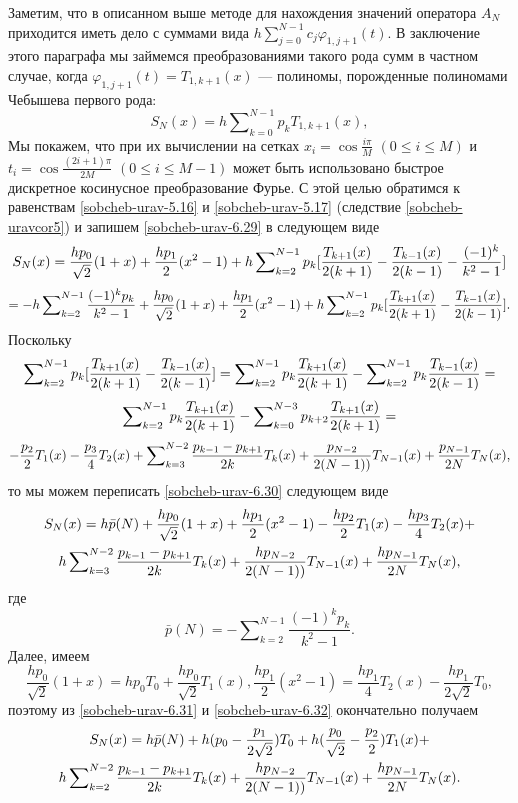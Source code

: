 Заметим, что в описанном выше методе для нахождения значений оператора $A_N$ приходится иметь дело с суммами вида $h\sum\nolimits_{j=0}^{N-1} c_j\varphi_{1,j+1}(t)$. В заключение этого параграфа мы займемся преобразованиями такого рода сумм в частном случае, когда $\varphi_{1,j+1}(t)=T_{1,k+1}(x)$ --- полиномы, порожденные полиномами Чебышева первого рода:
\begin{equation}\label{sobcheb-urav-6.29}
 S_N(x)=h\sum\nolimits_{k=0}^{N-1}p_kT_{1,k+1}(x),
\end{equation}
Мы покажем, что при их вычислении на сетках $x_i=\cos\frac{i\pi}{M}$ $(0\le i\le M)$ и $t_i=\cos\frac{(2i+1)\pi}{2M}$ $(0\le i\le M-1)$ может быть использовано быстрое дискретное косинусное преобразование Фурье. С этой целью обратимся к равенствам \eqref{sobcheb-urav-5.16} и \eqref{sobcheb-urav-5.17} (следствие \ref{sobcheb-uravcor5}) и запишем  \eqref{sobcheb-urav-6.29} в следующем виде
$$
S_N(x)=\frac{hp_0}{\sqrt{2}}(1+x)+\frac{hp_1}2(x^2-1)+ h\sum\nolimits_{k=2}^{N-1}p_k[{T_{k+1}(x)\over2(k+1)}- {T_{k-1}(x)\over2(k-1)} -\frac{(-1)^k}{k^2-1}]
$$
\begin{equation}\label{sobcheb-urav-6.30}
  =-h\sum\nolimits_{k=2}^{N-1} \frac{(-1)^kp_k}{k^2-1}+\frac{hp_0}{\sqrt{2}}(1+x)+\frac{hp_1}2(x^2-1)+
  h\sum\nolimits_{k=2}^{N-1}p_k[{T_{k+1}(x)\over2(k+1)}- {T_{k-1}(x)\over2(k-1)} ].
\end{equation}
Поскольку
$$
\sum\nolimits_{k=2}^{N-1}p_k[{T_{k+1}(x)\over2(k+1)}- {T_{k-1}(x)\over2(k-1)} ]=
\sum\nolimits_{k=2}^{N-1}p_k{T_{k+1}(x)\over2(k+1)}-\sum\nolimits_{k=2}^{N-1}p_k{T_{k-1}(x)\over2(k-1)}=
$$
$$
\sum\nolimits_{k=2}^{N-1}p_k{T_{k+1}(x)\over2(k+1)}-\sum\nolimits_{k=0}^{N-3}p_{k+2}{T_{k+1}(x)\over2(k+1)}=
$$
$$
-{p_{2}\over2}T_{1}(x)-{p_{3}\over4}T_{2}(x)+\sum\nolimits_{k=3}^{N-2}{p_{k-1}-p_{k+1}\over2k}T_k(x)
+{p_{N-2}\over2(N-1))}T_{N-1}(x)+{p_{N-1}\over2N}T_{N}(x),
$$
то   мы можем переписать \eqref{sobcheb-urav-6.30}   следующем виде
\begin{multline}\label{sobcheb-urav-6.31}
 S_N(x)=h\bar p(N)+\frac{hp_0}{\sqrt{2}}(1+x)+\frac{hp_1}2(x^2-1)-{hp_{2}\over2}T_{1}(x)-{hp_{3}\over4}T_{2}(x)+
 \\
h\sum\nolimits_{k=3}^{N-2}{p_{k-1}-p_{k+1}\over2k}T_k(x)
+{hp_{N-2}\over2(N-1))}T_{N-1}(x)+{hp_{N-1}\over2N}T_{N}(x),
  \end{multline}
где
\begin{equation}\label{sobcheb-urav-6.32}
 \bar p(N)= -\sum\nolimits_{k=2}^{N-1} \frac{(-1)^kp_k}{k^2-1}.
\end{equation}
 Далее, имеем
$$
\frac{hp_0}{\sqrt{2}}(1+x)=hp_0T_0+\frac{hp_0}{\sqrt{2}}T_1(x), \frac{hp_1}2(x^2-1)= \frac{hp_1}4T_2(x) -\frac{hp_1}{2\sqrt{2}}T_0,
$$
поэтому из \eqref{sobcheb-urav-6.31} и  \eqref{sobcheb-urav-6.32} окончательно получаем
\begin{multline}\label{sobcheb-urav-6.33}
 S_N(x)=h\bar p(N)+h(p_0-\frac{p_1}{2\sqrt{2}})T_0+h(\frac{p_0}{\sqrt{2}}-{p_{2}\over2})T_1(x)+
 \\
h\sum\nolimits_{k=2}^{N-2}{p_{k-1}-p_{k+1}\over2k}T_k(x)
+{hp_{N-2}\over2(N-1))}T_{N-1}(x)+{hp_{N-1}\over2N}T_{N}(x).
  \end{multline}



